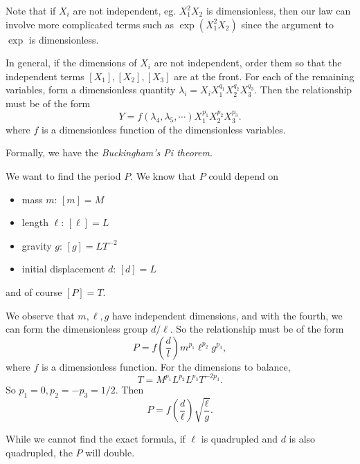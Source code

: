 \documentclass[a4paper]{article}
\begin{document}
Note that if $X_i$ are not independent, eg. $X_1^2X_2$ is dimensionless, then our law can involve more complicated terms such as $\exp (X_1^2 X_2)$ since the argument to $\exp$ is dimensionless.

In general, if the dimensions of $X_i$ are not independent, order them so that the independent terms $[X_1], [X_2], [X_3]$ are at the front. For each of the remaining variables, form a dimensionless quantity $\lambda_i = X_iX_1^{q_1}X_2^{q_2}X_3^{q_3}$.
Then the relationship must be of the form
\[
  Y = f(\lambda_4, \lambda_5, \cdots) X_1^{p_1}X_2^{p_2}X_3^{p_3}.
\]
where $f$ is a dimensionless function of the dimensionless variables.

Formally, we have the \emph{Buckingham's Pi theorem}.

\begin{eg}\leavevmode
  \begin{center}
  \end{center}
  We want to find the period $P$. We know that $P$ could depend on 
  \begin{itemize}
    \item mass $m$: $[m] = M$
    \item length $\ell$: $[\ell] = L$
    \item gravity $g$: $[g] = LT^{-2}$
    \item initial displacement $d$: $[d] = L$
  \end{itemize}
  and of course $[P] = T$.

  We observe that $m, \ell, g$ have independent dimensions, and with the fourth, we can form the dimensionless group $d/\ell$. So the relationship must be of the form
  \[
    P = f\left(\frac{d}{l}\right) m^{p_1}\ell^{p_2}g^{p_3},
  \]
  where $f$ is a dimensionless function. For the dimensions to balance,
  \[
    T = M^{p_1}L^{p_2}L^{p_3}T^{-2p_3}.
  \]
  So $p_1 = 0, p_2 = -p_3 = 1/2$. Then
  \[
    P = f\left(\frac{d}{\ell}\right) \sqrt{\frac{\ell}{g}}.
  \]

  While we cannot find the exact formula, if $\ell$ is quadrupled and $d$ is also quadrupled, the $P$ will double. 
\end{eg}
\end{document}
